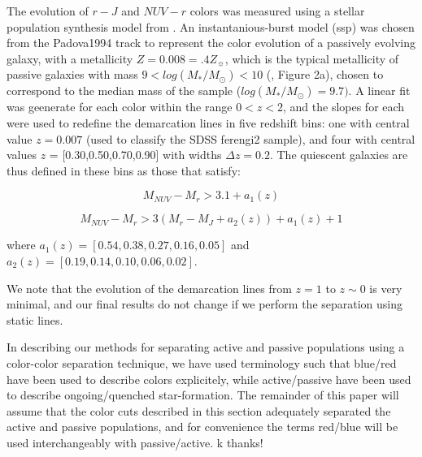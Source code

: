 \documentclass[useAMS,usenatbib]{mn2e}
\begin{document}
The evolution of $r-J$ and $NUV-r$ colors was measured using a stellar population synthesis model from \citet{Bruzual2003}. An instantanious-burst model (ssp) was chosen from the Padova1994 track to represent the color evolution of a passively evolving galaxy, with a metallicity $Z=0.008=.4Z_{\sun}$, which is the typical metallicity of passive galaxies with mass $9 < log(M_{*}/M_{\odot}) < 10$ (\citet{Peng2015}, Figure 2a), chosen to correspond to the median mass of the sample ($log(M_{*}/M_{\odot})=9.7)$. A linear fit was geenerate for each color within the range $0<z<2$, and the slopes for each were used to redefine the demarcation lines in five redshift bins: one with central value $z=0.007$ (used to classify the SDSS ferengi2 sample), and four with central values $z$ = [0.30,0.50,0.70,0.90] with widths $\Delta z=0.2$. The quiescent galaxies are thus defined in these bins as those that satisfy:

\begin{equation}
M_{NUV}-M_{r} > 3.1 + a_{1}(z)
\end{equation}

\begin{equation}
M_{NUV}-M_{r} > 3(M_{r}-M_{J} + a_{2}(z))+ a_{1}(z) + 1  
\end{equation}

where $a_{1}(z) = [0.54,0.38,0.27,0.16,0.05]$ and $a_{2}(z) = [0.19,0.14,0.10,0.06,0.02]$. 

We note that the evolution of the demarcation lines from $z=1$ to $z\sim0$ is very minimal, and our final results do not change if we perform the separation using static lines.


In describing our methods for separating active and passive populations using a color-color separation technique, we have used terminology such that blue/red have been used to describe colors explicitely, while active/passive have been used to describe ongoing/quenched star-formation. The remainder of this paper will assume that the color cuts described in this section adequately separated the active and passive populations, and for convenience the terms red/blue will be used interchangeably with passive/active. k thanks! 
\end{document}
